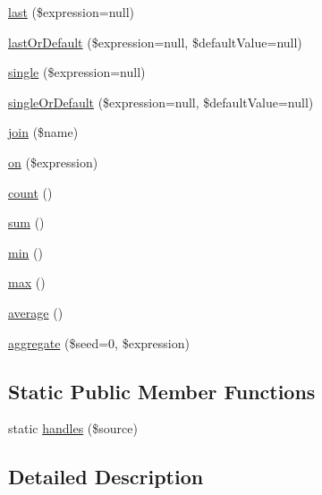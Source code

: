 \begin{DoxyCompactItemize}
\item 
\hyperlink{class_p_h_p_linq___linq_to_objects_a473a30c27001f1edc74b1b94f481c8d7}{last} (\$expression=null)
\item 
\hyperlink{class_p_h_p_linq___linq_to_objects_a87a27c9a37068fdadedb4d026eba831a}{last\-Or\-Default} (\$expression=null, \$default\-Value=null)
\item 
\hyperlink{class_p_h_p_linq___linq_to_objects_ab32beb141f7ae12ac580c8c1b0506390}{single} (\$expression=null)
\item 
\hyperlink{class_p_h_p_linq___linq_to_objects_a204daca32909a6031584dcd308be29e0}{single\-Or\-Default} (\$expression=null, \$default\-Value=null)
\item 
\hyperlink{class_p_h_p_linq___linq_to_objects_a1ac24d63648701a6876a2eb91f03900d}{join} (\$name)
\item 
\hyperlink{class_p_h_p_linq___linq_to_objects_a000230305e785b77bb55704d625d103b}{on} (\$expression)
\item 
\hyperlink{class_p_h_p_linq___linq_to_objects_ac751e87b3d4c4bf2feb03bee8b092755}{count} ()
\item 
\hyperlink{class_p_h_p_linq___linq_to_objects_adce2d1b0fc342d86c949a3588b78ebe6}{sum} ()
\item 
\hyperlink{class_p_h_p_linq___linq_to_objects_a0bb962b33915e2c1a507e95798a453a6}{min} ()
\item 
\hyperlink{class_p_h_p_linq___linq_to_objects_aa53a1564d7748b63ad507d7136c852fb}{max} ()
\item 
\hyperlink{class_p_h_p_linq___linq_to_objects_a8fa5690da6dbfe97e5f2ebfda9dc997f}{average} ()
\item 
\hyperlink{class_p_h_p_linq___linq_to_objects_a6b6ca639b69217bb6d4f12a8a3fcbf44}{aggregate} (\$seed=0, \$expression)
\end{DoxyCompactItemize}
\subsection*{\-Static \-Public \-Member \-Functions}
\begin{DoxyCompactItemize}
\item 
static \hyperlink{class_p_h_p_linq___linq_to_objects_a9cac44c1999a5e76809136f13aa20639}{handles} (\$source)
\end{DoxyCompactItemize}


\subsection{\-Detailed \-Description}


